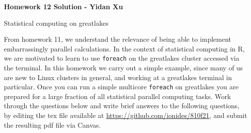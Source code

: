 \documentclass[12pt]{article}
\begin{document}
\begin{center}\bf
Homework 12 Solution - Yidan Xu

Statistical computing on greatlakes

\end{center}

From homework 11, we understand the relevance of being able to implement embarrassingly parallel calculations. In the context of statistical computing in R, we are motivated to learn to use \texttt{foreach} on the greatlakes cluster accessed via the terminal. In this homework we carry out a simple example, since many of us are new to Linux clusters in general, and working at a greatlakes terminal in particular. Once you can run a simple multicore \texttt{foreach} on greatlakes you are prepared for a large fraction of all statistical parallel computing tasks. Work through the questions below and write brief answers to the following questions, by editing the tex file available at \url{https://github.com/ionides/810f21}, and submit the resulting pdf file via Canvas. 
\end{document}
